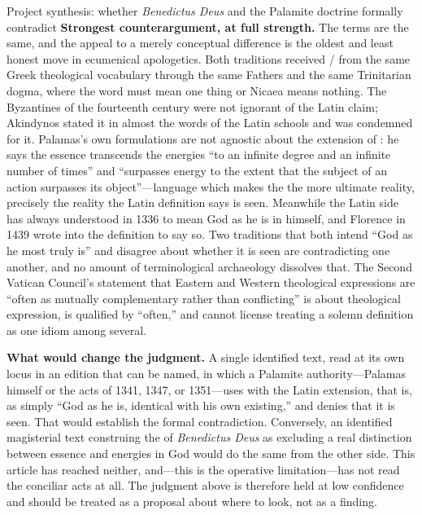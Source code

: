 \begin{studybox}{Project synthesis: whether \emph{Benedictus Deus} and the Palamite doctrine formally contradict}
\smallskip
\textbf{Strongest counterargument, at full strength.} The terms are the same, and the appeal to a merely conceptual difference is the oldest and least honest move in ecumenical apologetics. Both traditions received / from the same Greek theological vocabulary through the same Fathers and the same Trinitarian dogma, where the word must mean one thing or Nicaea means nothing. The Byzantines of the fourteenth century were not ignorant of the Latin claim; Akindynos stated it in almost the words of the Latin schools and was condemned for it. Palamas's own formulations are not agnostic about the extension of : he says the essence transcends the energies ``to an infinite degree and an infinite number of times'' and ``surpasses energy to the extent that the subject of an action surpasses its object''---language which makes the  the more ultimate reality, precisely the reality the Latin definition says is seen. Meanwhile the Latin side has always understood  in 1336 to mean God as he is in himself, and Florence in 1439 wrote  into the definition to say so. Two traditions that both intend ``God as he most truly is'' and disagree about whether it is seen are contradicting one another, and no amount of terminological archaeology dissolves that. The Second Vatican Council's statement that Eastern and Western theological expressions are ``often as mutually complementary rather than conflicting'' is about theological expression, is qualified by ``often,'' and cannot license treating a solemn definition as one idiom among several.

\smallskip
\textbf{What would change the judgment.} A single identified text, read at its own locus in an edition that can be named, in which a Palamite authority---Palamas himself or the acts of 1341, 1347, or 1351---uses  with the Latin extension, that is, as simply ``God as he is, identical with his own existing,'' and denies that it is seen. That would establish the formal contradiction. Conversely, an identified magisterial text construing the  of \emph{Benedictus Deus} as excluding a real distinction between essence and energies in God would do the same from the other side. This article has reached neither, and---this is the operative limitation---has not read the conciliar acts at all. The judgment above is therefore held at low confidence and should be treated as a proposal about where to look, not as a finding.
\end{studybox}


